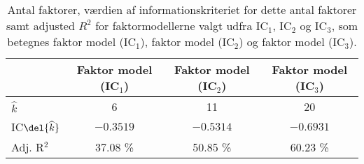 \begin{table}[h]
\center
\begin{tabular}{lccc}
\toprule
& Faktor model (IC$_1$) & Faktor model (IC$_2$) & Faktor model (IC$_3$) \\ \midrule
$\widehat{k}$ & 6 & 11 & 20 \\ 
IC$\del{\widehat{k}}$ & $-0.3519$  & $-0.5314$ & $-0.6931$  \\
Adj. R$^2$ & 37.08 \% & 50.85 \% & 60.23 \% \\ \bottomrule
 \end{tabular}
\caption{Antal faktorer, værdien af informationskriteriet for dette antal faktorer samt adjusted \(R^2\) for faktormodellerne valgt udfra IC$_1$, IC$_2$ og IC$_3$, som betegnes faktor model (IC\(_1\)), faktor model (IC\(_2\)) og faktor model (IC\(_3\)).} \label{tab:est_faktor}
\end{table}